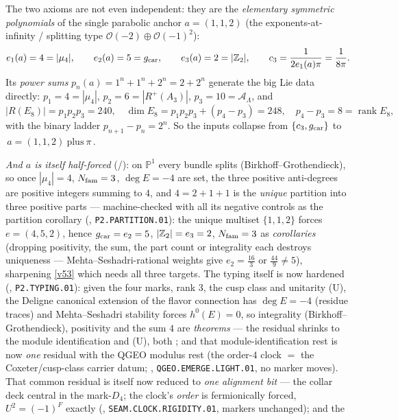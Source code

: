 \noindent The two axioms are not even independent: they are the \emph{elementary symmetric polynomials} of the
single parabolic anchor $a=(1,1,2)$ (the exponents-at-infinity / splitting type $\mathcal O(-2)\oplus\mathcal O(-1)^2$):
\[
  e_1(a)=4=|\mu_4|,\qquad e_2(a)=5=g_{\mathrm{car}},\qquad e_3(a)=2=|\mathbb{Z}_2|,\qquad
  c_3=\frac1{2e_1(a)\pi}=\frac1{8\pi}.
\]
Its \emph{power sums} $p_n(a)=1^n{+}1^n{+}2^n=2{+}2^n$ generate the big Lie data directly:
$p_1{=}4{=}|\mu_4|$, $p_2{=}6{=}|R^+(A_3)|$, $p_3{=}10{=}\mathcal A_\Lambda$, and
\[
  |R(E_8)|=p_1p_2p_3=240,\quad \dim E_8=p_1p_2p_3+(p_4-p_3)=248,\quad p_4-p_3=8=\operatorname{rank}E_8,
\]
with the binary ladder $p_{n+1}-p_n=2^n$. So the inputs collapse from $\{c_3,g_{\mathrm{car}}\}$ to
$\boxed{\,a=(1,1,2)\ \text{plus}\ \pi\,}$. 
\par\smallskip
\noindent\emph{And $a$ is itself half-forced} (\mE/\mC): on $\mathbb P^1$ every bundle splits
(Birkhoff--Grothendieck), so once $|\mu_4|=4$, $N_{\mathrm{fam}}=3$, $\deg E=-4$ are set, the three positive
anti-degrees are positive integers summing to $4$, and $4=2+1+1$ is the \emph{unique} partition into three
positive parts --- machine-checked with all its negative controls as the partition corollary
(, \texttt{P2.PARTITION.01}): the unique multiset $\{1,1,2\}$
forces $e=(4,5,2)$, hence $g_{\mathrm{car}}=e_2=5$, $|\mathbb{Z}_2|=e_3=2$, $N_{\mathrm{fam}}=3$ as \emph{corollaries} (dropping
positivity, the sum, the part count or integrality each destroys uniqueness --- Mehta--Seshadri-rational
weights give $e_2=\tfrac{16}3$ or $\tfrac{44}9\neq5$), sharpening \vref{v53} which needs all three targets.
The typing itself is now hardened (, \texttt{P2.TYPING.01}): given
the four marks, rank $3$, the cusp class and unitarity (U), the Deligne canonical extension of the flavor
connection has $\deg E=-4$ (residue traces) and Mehta--Seshadri stability forces $h^0(E)=0$, so
integrality (Birkhoff--Grothendieck), positivity and the sum $4$ are \emph{theorems} --- the residual
shrinks to the module identification and (U), both \mC; and that module-identification rest is now
\emph{one} residual with the QGEO modulus rest (the order-$4$ clock $=$ the Coxeter/cusp-class carrier
datum; , \texttt{QGEO.EMERGE.LIGHT.01}, no marker moves).
That common residual is itself now reduced to \emph{one alignment bit} --- the collar deck central in
the mark-$D_4$; the clock's \emph{order} is fermionically forced, $U^2=(-1)^F$ exactly
(, \texttt{SEAM.CLOCK.RIGIDITY.01}, markers unchanged); and the
